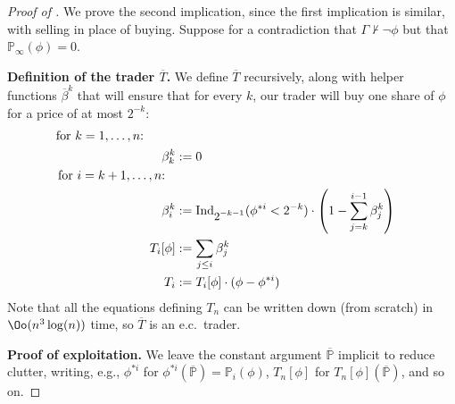 \documentclass[authordate,onecolumn,noenvironments]{miri-tech-article}
\numberwithin{equation}{subsection}
\newcommand{\seq}[1]{{\overline{#1}}}
\newcommand{\nn}{n}
\newcommand{\ec}[1][\ ]{e.c.#1}
\newcommand{\tinysection}[1]{\medskip\noindent\textbf{#1.}}
\newcommand{\trade}{T}%
\newcommand{\Trader}{\seq{\trade}} %
\newcommand{\strat}{T} %
\newcommand{\BelState}{\mathbb{P}}
\newcommand{\pt}{\BelState}
\newcommand{\MP}{\seq{\pt}}
\newcommand{\Theory}{\Gamma}
\newcommand{\ctsind}[1]{\operatorname{Ind}_{\text{\small{${#1}$}}}} %
\begin{document}
\begin{proof}[Proof of ]
We prove the second implication, since the first implication is similar, with selling in place of buying.  Suppose for a contradiction that $\Theory \nvdash \neg\phi$ but that $\pt_\infty(\phi)=0$.  

\tinysection{Definition of the trader $\Trader$} We define $\Trader$ recursively, along with helper functions $\seq\beta^k$ that will ensure that for every $k$, our trader will buy one share of $\phi$ for a price of at most $2^{-k}$:
%
\begin{align*}
\text{for $k=1,\ldots,\nn$:\hphantom{$,+1$}}\;\;\;\\
\beta^k_k &:=0\\
\text{for $i=k+1,\ldots,\nn$:}\;\;\;\\
\beta^k_i &:= \ctsind{2^{-k-1}}(\phi^{*i}<2^{-k})\cdot\left(1-\sum_{j=k}^{i-1}\beta^k_j \right)\\
\strat_i[\phi] &:= \sum_{j \le i} \beta^k_j\\
\strat_i &:= \strat_i[\phi]\cdot(\phi-\phi^{*i})
\end{align*}
\noindent Note that all the equations defining $\strat_\nn$ can be written down (from scratch) in $\Oo(\nn^3\log(n))$ time, so $\Trader$ is an \ec trader.

\tinysection{Proof of exploitation} We leave the constant argument $\MP$ implicit to reduce clutter, writing, e.g., $\phi^{*i}$ for $\phi^{*i}(\MP) = \pt_i(\phi)$, $\strat_\nn[\phi]$ for $\strat_\nn[\phi](\MP)$, and so on.


\end{proof}
\end{document}
